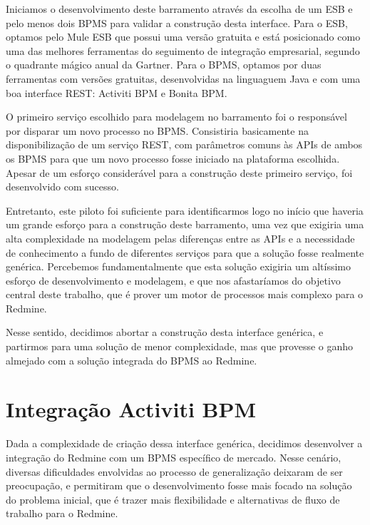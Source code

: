 Iniciamos o desenvolvimento deste barramento através da escolha de um ESB e pelo menos dois BPMS para validar a construção desta interface. Para o ESB, optamos pelo Mule ESB\cite{mule} que possui uma versão gratuita e está posicionado como uma das melhores ferramentas do seguimento de integração empresarial, segundo o quadrante mágico anual da Gartner\cite{mule_gartner}. Para o BPMS, optamos por duas ferramentas com versões gratuitas, desenvolvidas na linguaguem Java e com uma boa interface REST: Activiti BPM\cite{bpm_activiti} e Bonita BPM\cite{bpm_bonita}.

O primeiro serviço escolhido para modelagem no barramento foi o responsável por disparar um novo processo no BPMS. Consistiria basicamente na disponibilização de um serviço REST, com parâmetros comuns às APIs de ambos os BPMS para que um novo processo fosse iniciado na plataforma escolhida. Apesar de um esforço considerável para a construção deste primeiro serviço, foi desenvolvido com sucesso.  

Entretanto, este piloto foi suficiente para identificarmos logo no início que haveria um grande esforço para a construção deste barramento, uma vez que exigiria uma alta complexidade na modelagem pelas diferenças entre as APIs e a necessidade de conhecimento a fundo de diferentes serviços para que a solução fosse realmente genérica. Percebemos fundamentalmente que esta solução exigiria um altíssimo esforço de desenvolvimento e modelagem, e que nos afastaríamos do objetivo central deste trabalho, que é prover um motor de processos mais complexo para o Redmine. 

Nesse sentido, decidimos abortar a construção desta interface genérica, e partirmos para uma solução de menor complexidade, mas que provesse o ganho almejado com a solução integrada do BPMS ao Redmine.

\section{Integração Activiti BPM}\label{sec:activiti-bpm}

Dada a complexidade de criação dessa interface genérica, decidimos desenvolver a integração do Redmine com um BPMS específico de mercado. Nesse cenário, diversas dificuldades envolvidas ao processo de generalização deixaram de ser preocupação, e permitiram que o desenvolvimento fosse mais focado na solução do problema inicial, que é trazer mais flexibilidade e alternativas de fluxo de trabalho para o Redmine.

